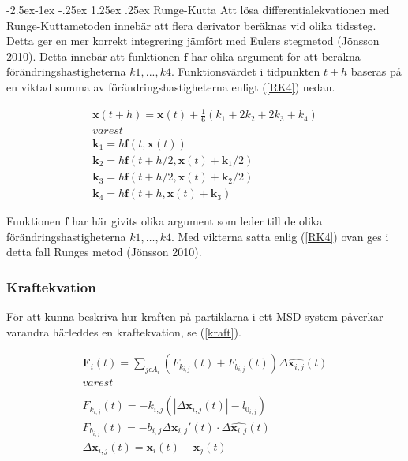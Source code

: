 \documentclass[a4paper,12pt,oneside,final,swedish]{extarticle}
\makeatletter
\renewcommand\paragraph{\@startsection{paragraph}{4}{\z@}%
            {-2.5ex\@plus -1ex \@minus -.25ex}%
            {1.25ex \@plus .25ex}%
            {\normalfont\normalsize\bfseries}}
\makeatother
\begin{document}
\paragraph{Runge-Kutta}%
Att lösa differentialekvationen med Runge-Kuttametoden innebär att flera derivator beräknas vid olika tidssteg. Detta ger en mer korrekt integrering jämfört med Eulers stegmetod (Jönsson 2010). Detta innebär att funktionen \begin{math}\mathbf f \end{math} har olika argument för att beräkna förändringshastigheterna $k1, ..., k4$. Funktionsvärdet i tidpunkten $t+h$ baseras på en viktad summa av förändringshastigheterna enligt (\ref{RK4}) nedan.

\begin{equation}
\begin{split}
\mathbf x(t+h)=\mathbf x(t)+\frac { 1 }{ 6 } ({ k }_{ 1 }+2{ k }_{ 2 }+2{ k }_{ 3 }+{ k }_{ 4 })
\\ varest
\\ \mathbf{ k }_{ 1 }=h\mathbf f(t,\mathbf x(t))
\\ \mathbf{ k }_{ 2 }=h\mathbf f(t+h/2,\mathbf x(t)+\mathbf { k }_{ 1 }/2)
\\ \mathbf{ k }_{ 3 }=h\mathbf f(t+h/2,\mathbf x(t)+\mathbf{ k }_{ 2 }/2)
\\ \mathbf{ k }_{ 4 }=h\mathbf f(t+h,\mathbf x(t)+\mathbf{ k }_{ 3 })
\end{split}
\label{RK4}
\end{equation}

Funktionen \begin{math}\mathbf f \end{math} har här givits olika argument som leder till de olika förändringshastigheterna $k1, …, k4$. Med vikterna satta enlig (\ref{RK4}) ovan ges i detta fall Runges metod (Jönsson 2010).
\subsubsection{Kraftekvation}

För att kunna beskriva hur kraften på partiklarna i ett MSD-system påverkar varandra härleddes en kraftekvation, se (\ref{kraft}).

\begin{equation}
\begin{split}
{ \mathbf{ F }_{ i } }(t)=\sum _{ j\epsilon { A }_{ i } }{ ({ F }_{ { k }_{ i,j } }(t)+{ F }_{ { b }_{ i,j } }(t))\Delta \hat { \mathbf{ x }_{ i,j } } (t) }
\\ varest
\\
\\ { F }_{ { k }_{ i,j } }(t)=-{ k }_{ i,j }(\left| \Delta { \mathbf{ x }_{ i,j }(t) } \right| -l_{ { 0 }_{ i,j } })
\\ { F }_{ { b }_{ i,j } }(t)=-{ b }_{ i,j }\Delta { \mathbf{ x }_{ i,j }'(t)\cdot  }\Delta { \hat { \mathbf{ x }_{ i,j } } (t) }
\\ \Delta \mathbf{ x }_{ i,j }(t)=\mathbf{ x }_{ i }(t)-\mathbf{ x }_{ j }(t)
\end{split}
\label{kraft}
\end{equation}
\end{document}
